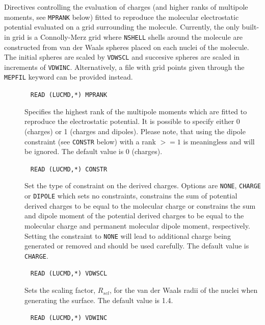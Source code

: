Directives controlling the evaluation of charges (and higher ranks of multipole moments, see \verb|MPRANK| below) fitted to reproduce the molecular electrostatic potential evaluated on a grid surrounding the molecule. Currently, the only built-in grid is a Connolly-Merz grid where \verb|NSHELL| shells around the molecule are constructed from van der Waals spheres placed on each nuclei of the molecule. The initial spheres are scaled by \verb|VDWSCL| and succesive spheres are scaled in increments of \verb|VDWINC|. Alternatively, a file with grid points given through the \verb|MEPFIL| keyword can be provided instead.

\begin{description}
\item[]\verb| |\newline
\verb|READ (LUCMD,*) MPRANK|

Specifies the highest rank of the multipole moments which are fitted to reproduce the electrostatic potential. It is possible to specify either 0 (charges) or 1 (charges and dipoles). Please note, that using the dipole constraint (see \verb|CONSTR| below) with a rank $>=1$ is meaningless and will be ignored. The default value is 0 (charges).

\item[]\verb| |\newline
\verb|READ (LUCMD,*) CONSTR|

Set the type of constraint on the derived charges. Options are \verb|NONE|, \verb|CHARGE| or \verb|DIPOLE| which sets no constraints, constrains the sum of potential derived charges to be equal to the molecular charge or constrains the sum and dipole moment of the potential derived charges to be equal to the molecular charge and permanent molecular dipole moment, respectively. Setting the constraint to \verb|NONE| will lead to additional charge being generated or removed and should be used carefully. The default value is \verb|CHARGE|.

\item[]\verb| |\newline
\verb|READ (LUCMD,*) VDWSCL|

Sets the scaling factor, $R_{scl}$, for the van der Waals radii of the nuclei when generating the surface. The default value is 1.4.

\item[]\verb| |\newline
\verb|READ (LUCMD,*) VDWINC|


\end{description}
